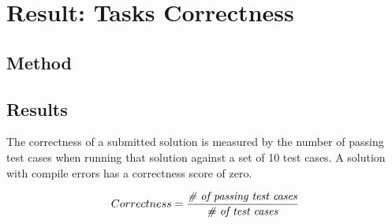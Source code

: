 
\section{Result: Tasks Correctness}
\label{cp6:correctness}





\subsection{Method}



\subsection{Results}
 
The correctness of a submitted solution is measured by the number of passing test cases
when running that solution against a set of 10 test cases. 
A solution with compile errors has a correctness score of zero.


\smallskip
\begin{small}


\begin{equation}
    Correctness = \frac{ \text{\textit{\# of passing test cases}}}{\text{\textit{\#  of test cases}}}
\end{equation}
\end{small}